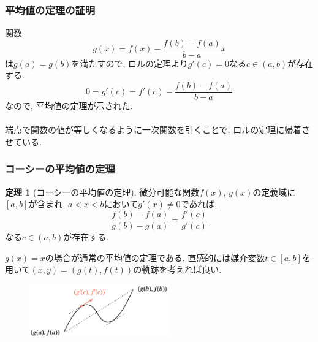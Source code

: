 \documentclass[dvipdfmx,cjk,10.2pt]{beamer}
\theoremstyle{definition}
\newtheorem{Thm}{定理}[section]
\begin{document}




\begin{frame}
\frametitle{平均値の定理の証明}


関数 
$$
g(x)=f(x)-\frac{f(b)-f(a)}{b-a}x
$$
は$g(a)=g(b)$を満たすので, ロルの定理より$g'(c)=0$なる$c \in (a,b)$が存在する. 
$$
0=g'(c)=f'(c)-\frac{f(b)-f(a)}{b-a}
$$
なので, 平均値の定理が示された. \\
\ \\

端点で関数の値が等しくなるように一次関数を引くことで, ロルの定理に帰着させている. 

\end{frame}







\begin{frame}
\frametitle{コーシーの平均値の定理}

\vspace{-1mm}

\begin{Thm}[コーシーの平均値の定理] 
微分可能な関数$f(x)$, $g(x)$の定義域に$[a,b]$が含まれ, $a<x<b$において$g'(x) \ne 0$であれば, 
$$
\frac{f(b)-f(a)}{g(b)-g(a)}=\frac{f'(c)}{g'(c)}
$$
なる$c \in (a,b)$が存在する. 
\end{Thm}

$g(x)=x$の場合が通常の平均値の定理である. 
直感的には媒介変数$t \in [a,b]$を用いて$(x,y)=(g(t),f(t))$の軌跡を考えれば良い. 

\vspace{-1mm}

 \begin{figure}[htbp]
 \begin{center} 
  \includegraphics[width=60mm]{CauchyMean.png}
 \end{center}
\end{figure}

\end{frame}
\end{document}
